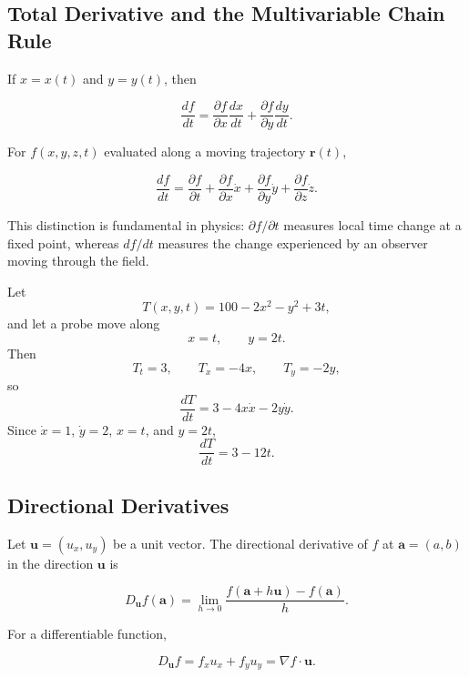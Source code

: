 \subsection{Total Derivative and the Multivariable Chain Rule}

If $x=x(t)$ and $y=y(t)$, then

\begin{equation}
\boxed{
\frac{df}{dt}
=
\frac{\partial f}{\partial x}\frac{dx}{dt}
+
\frac{\partial f}{\partial y}\frac{dy}{dt}.
}
\label{eq:total-derivative-two-vars}
\end{equation}

For $f(x,y,z,t)$ evaluated along a moving trajectory $\mathbf r(t)$,

\begin{equation}
\boxed{
\frac{df}{dt}
=
\frac{\partial f}{\partial t}
+
\frac{\partial f}{\partial x}\dot x
+
\frac{\partial f}{\partial y}\dot y
+
\frac{\partial f}{\partial z}\dot z.
}
\label{eq:material-chain-rule}
\end{equation}

This distinction is fundamental in physics: $\partial f/\partial t$ measures local time change at a fixed point, whereas $df/dt$ measures the change experienced by an observer moving through the field.

\begin{bookexample}
Let
\[
T(x,y,t)=100-2x^2-y^2+3t,
\]
and let a probe move along
\[
x=t,
\qquad
y=2t.
\]
Then
\[
T_t=3,
\qquad
T_x=-4x,
\qquad
T_y=-2y,
\]
so
\[
\frac{dT}{dt}=3-4x\dot x-2y\dot y.
\]
Since $\dot x=1$, $\dot y=2$, $x=t$, and $y=2t$,
\[
\boxed{\frac{dT}{dt}=3-12t.}
\]
\end{bookexample}

\subsection{Directional Derivatives}

Let $\mathbf u=(u_x,u_y)$ be a unit vector. The directional derivative of $f$ at $\mathbf a=(a,b)$ in the direction $\mathbf u$ is

\begin{equation}
\boxed{
D_{\mathbf u}f(\mathbf a)
=
\lim_{h\to0}
\frac{f(\mathbf a+h\mathbf u)-f(\mathbf a)}{h}.
}
\label{eq:directional-derivative-limit}
\end{equation}

For a differentiable function,

\begin{equation}
\boxed{
D_{\mathbf u}f
=
f_xu_x+f_yu_y
=
\nabla f\cdot\mathbf u.
}
\label{eq:directional-gradient}
\end{equation}

